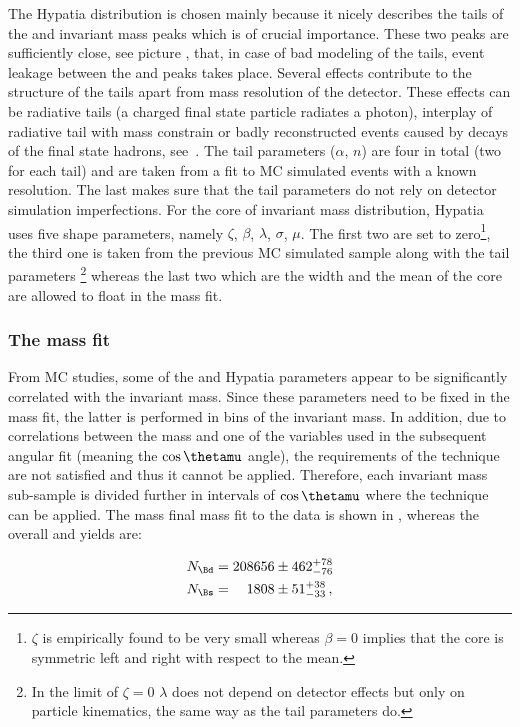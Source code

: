 The Hypatia distribution is chosen mainly because it nicely describes the tails of the \Bs and \Bd invariant mass peaks which is
of crucial importance. These two peaks are sufficiently close,
see picture , that, in case of bad modeling of the tails, event leakage between the \Bs and \Bd peaks
takes place. Several effects contribute to the structure of the tails apart from mass resolution of the detector. These effects
can be radiative tails (a charged final state particle radiates a photon), interplay of radiative tail with \jpsi mass constrain
or badly reconstructed events caused by decays of the final state hadrons, see~\cite{Santos:2013gra}. The tail parameters ($\alpha$, $n$)
are four in total (two for each tail) and are taken from a fit to MC simulated events with a known resolution. The last makes sure that
the tail parameters do not rely on detector simulation imperfections.
For the core of invariant mass distribution, Hypatia uses five shape parameters, namely $\zeta$, $\beta$, $\lambda$, $\sigma$, $\mu$.
The first two are set to zero\footnote{$\zeta$ is empirically found to be very small whereas
$\beta = 0$ implies that the core is symmetric left and right with respect to the mean.}, the third one is taken from the previous
MC simulated sample along with the tail parameters \footnote{In the limit of $\zeta = 0$ $\lambda$ does not depend on detector
effects but only on particle kinematics, the same way as the tail parameters do.} whereas the last two which are the width and
the mean of the core are allowed to float in the mass fit.

\subsubsection{The mass fit}
From MC studies, some of the \Bs and \Bd Hypatia parameters appear to be significantly correlated with the \mkpi invariant mass.
Since these parameters need to be fixed in the mass fit, the latter is performed in bins of the
\mkpi invariant mass. In addition, due to correlations between the mass and one of the variables used in the subsequent angular fit
(meaning the $\cos\thetamu$ angle), the requirements of the \sPlot technique are not satisfied and thus it cannot be applied.
Therefore, each \mkpi invariant mass sub-sample is divided further in intervals of $\cos\thetamu$ where the \sPlot technique
can be applied.  The mass final mass fit to the data is shown in , whereas the overall \Bs and \Bd yields are:


\begin{align}
N_{\Bd} &= 208656  \pm  462 ^{+ 78	}_{- 76}\\
N_{\Bs} &= \phantom{00}1808  \pm   51 ^{+ 38	}_{- 33} \, ,
\label{signal_yields}
\end{align}

